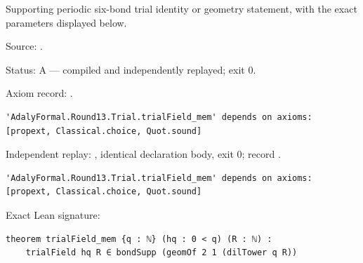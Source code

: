 \begin{theorem}[bp-367]
\label{bp-367}
\leanok
Supporting periodic six-bond trial identity or geometry statement, with the exact parameters displayed below.

\par Source: \texttt{}.
\par Status: A — compiled and independently replayed; exit 0.
\par Axiom record: \texttt{}.
\begin{verbatim}
'AdalyFormal.Round13.Trial.trialField_mem' depends on axioms: [propext, Classical.choice, Quot.sound]
\end{verbatim}
\par Independent replay: \texttt{}, identical declaration body, exit 0; record \texttt{}.
\begin{verbatim}
'AdalyFormal.Round13.Trial.trialField_mem' depends on axioms: [propext, Classical.choice, Quot.sound]
\end{verbatim}
\par Exact Lean signature:
\begin{verbatim}
theorem trialField_mem {q : ℕ} (hq : 0 < q) (R : ℕ) :
    trialField hq R ∈ bondSupp (geomOf 2 1 (dilTower q R))
\end{verbatim}
\end{theorem}

